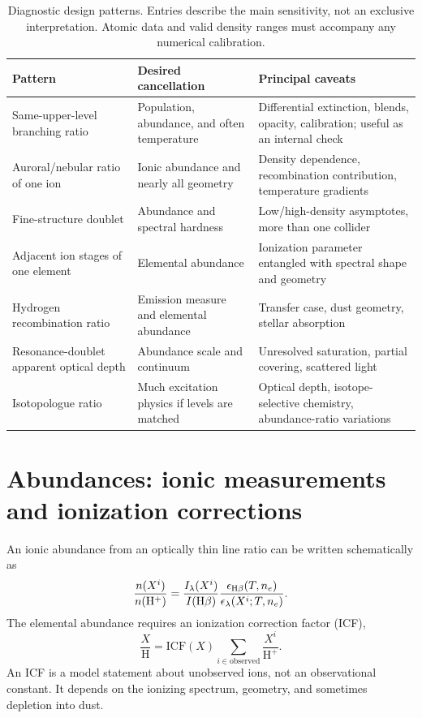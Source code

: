 \begin{table}[tbp]
\centering
\caption{Diagnostic design patterns.  Entries describe the main sensitivity, not an
exclusive interpretation.  Atomic data and valid density ranges must accompany any
numerical calibration.}
\label{tab:diagnostic-design-patterns}
\begin{tabularx}{\textwidth}{@{}
 >{\raggedright\arraybackslash}p{}
 >{\raggedright\arraybackslash}p{}
 >{\raggedright\arraybackslash}X@{}}
\toprule
Pattern & Desired cancellation & Principal caveats \\
\midrule
Same-upper-level branching ratio & Population, abundance, and often temperature &
Differential extinction, blends, opacity, calibration; useful as an internal check \\
Auroral/nebular ratio of one ion & Ionic abundance and nearly all geometry &
Density dependence, recombination contribution, temperature gradients \\
Fine-structure doublet & Abundance and spectral hardness &
Low/high-density asymptotes, more than one collider \\
Adjacent ion stages of one element & Elemental abundance &
Ionization parameter entangled with spectral shape and geometry \\
Hydrogen recombination ratio & Emission measure and elemental abundance &
Transfer case, dust geometry, stellar absorption \\
Resonance-doublet apparent optical depth & Abundance scale and continuum &
Unresolved saturation, partial covering, scattered light \\
Isotopologue ratio & Much excitation physics if levels are matched &
Optical depth, isotope-selective chemistry, abundance-ratio variations \\
\bottomrule
\end{tabularx}
\end{table}

\section{Abundances: ionic measurements and ionization corrections}

An ionic abundance from an optically thin line ratio can be written schematically as
\begin{equation}
 \frac{n(X^i)}{n({\rm H}^+)}=
 \frac{I_\lambda(X^i)}{I({\rm H}\beta)}
 \frac{\epsilon_{{\rm H}\beta}(T,n_e)}
      {\epsilon_\lambda(X^i;T,n_e)}.
 \label{eq:ionic-abundance}
\end{equation}
The elemental abundance requires an ionization correction factor (ICF),
\begin{equation}
 \frac{X}{\mathrm{H}}=\mathrm{ICF}(X)
 \sum_{i\in\mathrm{observed}}\frac{X^i}{\mathrm{H}^+}.
 \label{eq:ionization-correction-factor}
\end{equation}
An ICF is a model statement about unobserved ions, not an observational constant.
It depends on the ionizing spectrum, geometry, and sometimes depletion into dust.


